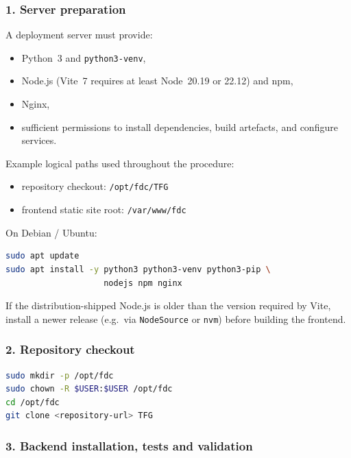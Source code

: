 \documentclass[11pt,a4paper]{article}
\begin{document}
\subsubsection{1. Server preparation}

A deployment server must provide:

\begin{itemize}[leftmargin=1.6em]
  \item Python~3 and \texttt{python3-venv},
  \item Node.js (Vite~7 requires at least Node~20.19 or 22.12) and npm,
  \item Nginx,
  \item sufficient permissions to install dependencies, build artefacts, and
        configure services.
\end{itemize}

Example logical paths used throughout the procedure:

\begin{itemize}[leftmargin=1.6em]
  \item repository checkout: \texttt{/opt/fdc/TFG}
  \item frontend static site root: \texttt{/var/www/fdc}
\end{itemize}

On Debian / Ubuntu:

\begin{lstlisting}[language=bash]
sudo apt update
sudo apt install -y python3 python3-venv python3-pip \
                    nodejs npm nginx
\end{lstlisting}

If the distribution-shipped Node.js is older than the version required by
Vite, install a newer release (e.g.\ via \texttt{NodeSource} or \texttt{nvm})
before building the frontend.

\subsubsection{2. Repository checkout}

\begin{lstlisting}[language=bash]
sudo mkdir -p /opt/fdc
sudo chown -R $USER:$USER /opt/fdc
cd /opt/fdc
git clone <repository-url> TFG
\end{lstlisting}

\subsubsection{3. Backend installation, tests and validation}
\end{document}
